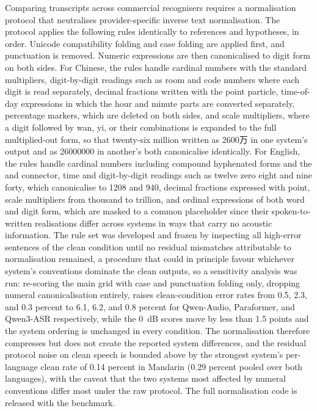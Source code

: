 Comparing transcripts across commercial recognisers requires a normalisation
protocol that neutralises provider-specific inverse text normalisation. The
protocol applies the following rules identically to references and
hypotheses, in order. Unicode compatibility folding and case folding are
applied first, and punctuation is removed. Numeric expressions are then
canonicalised to digit form on both sides. For Chinese, the rules handle
cardinal numbers with the standard multipliers, digit-by-digit readings such
as room and code numbers where each digit is read separately, decimal
fractions written with the point particle, time-of-day expressions in which
the hour and minute parts are converted separately, percentage markers,
which are deleted on both sides, and scale multipliers, where a digit
followed by wan, yi, or their combinations is expanded to the full
multiplied-out form, so that twenty-six million written as 2600万 in one
system's output and as 26000000 in another's both canonicalise identically.
For English, the rules handle cardinal numbers including compound
hyphenated forms and the and connector, time and digit-by-digit readings
such as twelve zero eight and nine forty, which canonicalise to 1208 and
940, decimal fractions expressed with point, scale multipliers from thousand
to trillion, and ordinal expressions of both word and digit form, which are
masked to a common placeholder since their spoken-to-written realisations
differ across systems in ways that carry no acoustic information. The rule
set was developed and frozen by inspecting all high-error sentences of the
clean condition until no residual mismatches attributable to normalisation
remained, a procedure that could in principle favour whichever system's
conventions dominate the clean outputs, so a sensitivity analysis was run:
re-scoring the main grid with case and punctuation folding only, dropping
numeral canonicalisation entirely, raises clean-condition error rates from
0.5, 2.3, and 0.3 percent to 6.1, 6.2, and 0.8 percent for Qwen-Audio,
Paraformer, and Qwen3-ASR respectively, while the 0~dB scores move by less
than 1.5 points and the system ordering is unchanged in every condition.
The normalisation therefore compresses but does not create the reported
system differences, and the residual protocol noise on clean speech is
bounded above by the strongest system's per-language clean rate of 0.14
percent in Mandarin (0.29 percent pooled over both languages), with the
caveat that the two systems most affected by numeral conventions differ
most under the raw protocol. The full normalisation code is released with
the benchmark.


